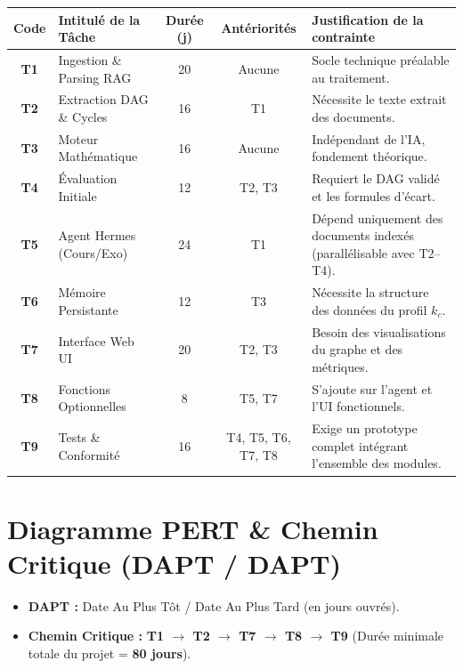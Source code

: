 \documentclass[11pt, a4paper]{article}
\begin{document}
\begin{table}[H]
\centering
\small
\begin{tabularx}{\textwidth}{c X c c X}
\toprule
\textbf{Code} & \textbf{Intitulé de la Tâche} & \textbf{Durée (j)} & \textbf{Antériorités} & \textbf{Justification de la contrainte} \\
\midrule
\textbf{T1} & Ingestion \& Parsing RAG & 20 & Aucune & Socle technique préalable au traitement. \\
\textbf{T2} & Extraction DAG \& Cycles & 16 & T1 & Nécessite le texte extrait des documents. \\
\textbf{T3} & Moteur Mathématique & 16 & Aucune & Indépendant de l'IA, fondement théorique. \\
\textbf{T4} & Évaluation Initiale & 12 & T2, T3 & Requiert le DAG validé et les formules d'écart. \\
\textbf{T5} & Agent Hermes (Cours/Exo) & 24 & T1 & Dépend uniquement des documents indexés (parallélisable avec T2--T4). \\
\textbf{T6} & Mémoire Persistante & 12 & T3 & Nécessite la structure des données du profil $k_c$. \\
\textbf{T7} & Interface Web UI & 20 & T2, T3 & Besoin des visualisations du graphe et des métriques. \\
\textbf{T8} & Fonctions Optionnelles & 8 & T5, T7 & S'ajoute sur l'agent et l'UI fonctionnels. \\
\textbf{T9} & Tests \& Conformité & 16 & T4, T5, T6, T7, T8 & Exige un prototype complet intégrant l'ensemble des modules. \\
\bottomrule
\end{tabularx}
\end{table}

\section{Diagramme PERT \& Chemin Critique (DAPT / DAPT)}

\begin{itemize}
    \item \textbf{DAPT :} Date Au Plus Tôt / Date Au Plus Tard (en jours ouvrés).
    \item \textbf{\color{critical}Chemin Critique :} \textbf{T1 $\rightarrow$ T2 $\rightarrow$ T7 $\rightarrow$ T8 $\rightarrow$ T9} (Durée minimale totale du projet = \textbf{80 jours}).
\end{itemize}
\end{document}
